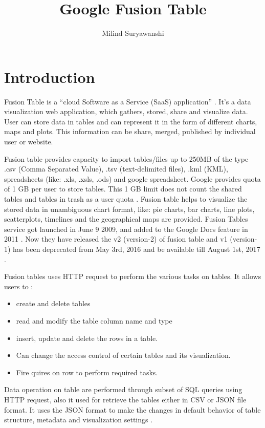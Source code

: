 \documentclass[9pt,twocolumn,twoside]{../../styles/osajnl}
\title{Google Fusion Table}
\author[1,2]{Milind Suryawanshi}
\affil[1]{School of Informatics and Computing, Bloomington, IN 47408, U.S.A.}
\affil[2]{Electronics and Telecommunication Engineer,Pune University, 2010}
\affil[*]{Corresponding authors: laszewski@gmail.com}
\begin{document}
\maketitle

\section{Introduction}

Fusion Table is a “cloud Software as a Service (SaaS) application” \cite{www-1}. It’s a data visualization web application, which gathers, stored, share and visualize data. User can store data in tables and can represent it in the form of different charts, maps and plots. This information can be share, merged, published by individual user or website.  

 
Fusion table provides capacity to import tables/files up to 250MB \cite{www-2} of the type .csv (Comma Separated Value), .tsv (text-delimited files), .kml (KML), spreadsheets (like: .xls, .xsls, .ods) and google spreadsheet. Google provides quota of 1 GB per user to store tables. This 1 GB limit does not count the shared tables and tables in trash as a user quota \cite{www-2}. Fusion table helps to visualize the stored data in unambiguous chart format, like: pie charts, bar charts, line plots, scatterplots, timelines and the geographical maps are provided. Fusion Tables service got launched in June 9 2009, and added to the Google Docs feature in 2011 \cite{www-3}. Now they have released the v2 (version-2) of fusion table and v1 (version-1) has been deprecated from May 3rd, 2016 and be available till August 1st, 2017 \cite{www-4}.


Fusion tables uses HTTP request to perform the various tasks on tables. It allows users to \cite{www-5}:

\begin{itemize}
	\item create and delete tables
	\item read and modify the table column name and type
	\item insert, update and delete the rows in a table.
	\item Can change the access control of certain tables and its visualization.
	\item Fire quires on row to perform required tasks.
\end{itemize}

Data operation on table are performed through subset of SQL queries using HTTP request, also it used for retrieve the tables either in CSV or JSON file format. It uses the JSON format to make the changes in default behavior of table structure, metadata and visualization settings \cite{www-5}. 
\end{document}
